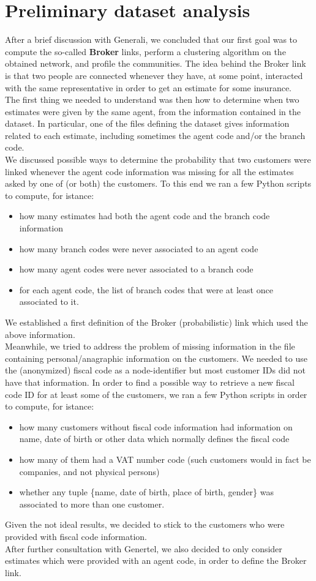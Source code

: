 \documentclass[a4paper,11pt]{book}
\begin{document}
\section{Preliminary dataset analysis}
After a brief discussion with Generali, we concluded that our first goal was to compute the so-called \textbf{Broker} links, perform a clustering algorithm on the obtained network, and profile the communities. The idea behind the Broker link is that two people are connected whenever they have, at some point, interacted with the same representative in order to get an estimate for some insurance.\\
The first thing we needed to understand was then how to determine when two estimates were given by the same agent, from the information contained in the dataset. In particular, one of the files defining the dataset gives information related to each estimate, including sometimes the agent code and/or the branch code.\\
We discussed possible ways to determine the probability that two customers were linked whenever the agent code information was missing for all the estimates asked by one of (or both) the customers. To this end we ran a few Python scripts to compute, for istance:
\begin{itemize}
\item how many estimates had both the agent code and the branch code information
\item how many branch codes were never associated to an agent code
\item how many agent codes were never associated to a branch code
\item for each agent code, the list of branch codes that were at least once associated to it.
\end{itemize}
We established a first definition of the Broker (probabilistic) link which used the above information.\\

Meanwhile, we tried to address the problem of missing information in the file containing personal/anagraphic information on the customers. We needed to use the (anonymized) fiscal code as a node-identifier but most customer IDs did not have that information. In order to find a possible way to retrieve a new fiscal code ID for at least some of the customers, we ran a few Python scripts in order to compute, for istance:
\begin{itemize}
\item how many customers without fiscal code information had information on name, date of birth or other data which normally defines the fiscal code
\item how many of them had a VAT number code (such customers would in fact be companies, and not physical persons)
\item whether any tuple \{name, date of birth, place of birth, gender\} was associated to more than one customer.
\end{itemize}
Given the not ideal results, we decided to stick to the customers who were provided with fiscal code information.\\
After further consultation with Genertel, we also decided to only consider estimates which were provided with an agent code, in order to define the Broker link.
\end{document}
